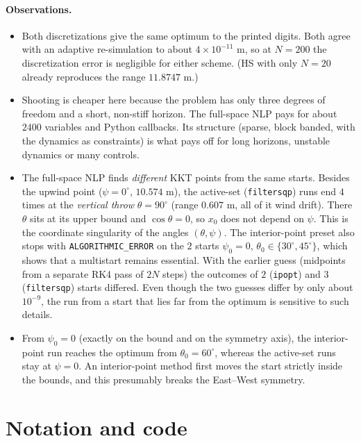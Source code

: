 \documentclass[11pt]{article}
\begin{document}
\paragraph{Observations.}
\begin{itemize}
  \item Both discretizations give the same optimum to the printed digits. Both agree with an
        adaptive re-simulation to about $4\times10^{-11}$ m, so at $N=200$ the discretization error is
        negligible for either scheme. (HS with only $N=20$ already reproduces the range
        $11.8747$ m.)
  \item Shooting is cheaper here because the problem has only three degrees of freedom and a
        short, non-stiff horizon. The full-space NLP pays for about $2400$ variables and Python
        callbacks. Its structure (sparse, block banded, with the dynamics as constraints)
        is what pays off for long horizons, unstable dynamics or many controls.
  \item The full-space NLP finds \emph{different} KKT points from the same starts. Besides the upwind
        point ($\psi=0^\circ$, $10.574$ m), the active-set (\texttt{filtersqp}) runs end $4$ times at the \emph{vertical throw}
        $\theta = 90^\circ$ (range $0.607$ m, all of it wind drift). There $\theta$ sits at its upper bound and
        $\cos\theta = 0$, so $x_0$ does not depend on $\psi$. This is the coordinate singularity of the
        angles $(\theta,\psi)$. The interior-point preset also stops with
        \texttt{ALGORITHMIC\_ERROR} on the $2$ starts $\psi_0=0$, $\theta_0\in\{30^\circ,45^\circ\}$, which
        shows that a multistart remains essential. With the earlier guess (midpoints from a
        separate RK4 pass of $2N$ steps) the outcomes of $2$ (\texttt{ipopt}) and $3$ (\texttt{filtersqp})
        starts differed. Even though the two guesses differ by only about $10^{-9}$, the run from a start that lies far from the
        optimum is sensitive to such details.
  \item From $\psi_0 = 0$ (exactly on the bound and on the symmetry axis), the interior-point run
        reaches the optimum from $\theta_0=60^\circ$, whereas the active-set runs stay at $\psi=0$.
        An interior-point method first moves the start strictly inside the bounds, and this
        presumably breaks the East--West symmetry.
\end{itemize}

\section{Notation and code}
\end{document}
